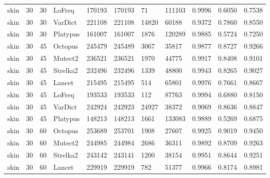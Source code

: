 \documentclass{article}
\begin{document}
\begin{table}[ht!]
{\begin{tabular}{lrrllllllll}
   skin &            30 &            30 &    LoFreq &            170193 &        170193 &        71 &    111103 &    0.9996 &      0.6050 &    0.7538 \\
   skin &            30 &            30 &   VarDict &            221108 &        221108 &     14820 &     60188 &    0.9372 &      0.7860 &    0.8550 \\
   skin &            30 &            30 &  Platypus &            161007 &        161007 &      1876 &    120289 &    0.9885 &      0.5724 &    0.7250 \\
   skin &            30 &            45 &   Octopus &            245479 &        245489 &      3067 &     35817 &    0.9877 &      0.8727 &    0.9266 \\
   skin &            30 &            45 &   Mutect2 &            236521 &        236521 &      1970 &     44775 &    0.9917 &      0.8408 &    0.9101 \\
   skin &            30 &            45 &  Strelka2 &            232496 &        232496 &      1339 &     48800 &    0.9943 &      0.8265 &    0.9027 \\
   skin &            30 &            45 &    Lancet &            215495 &        215495 &       514 &     65801 &    0.9976 &      0.7661 &    0.8667 \\
   skin &            30 &            45 &    LoFreq &            193533 &        193533 &       112 &     87763 &    0.9994 &      0.6880 &    0.8150 \\
   skin &            30 &            45 &   VarDict &            242924 &        242923 &     24927 &     38372 &    0.9069 &      0.8636 &    0.8847 \\
   skin &            30 &            45 &  Platypus &            148213 &        148213 &      1661 &    133083 &    0.9889 &      0.5269 &    0.6875 \\
   skin &            30 &            60 &   Octopus &            253689 &        253701 &      1908 &     27607 &    0.9925 &      0.9019 &    0.9450 \\
   skin &            30 &            60 &   Mutect2 &            244985 &        244984 &      2686 &     36311 &    0.9892 &      0.8709 &    0.9263 \\
   skin &            30 &            60 &  Strelka2 &            243142 &        243141 &      1200 &     38154 &    0.9951 &      0.8644 &    0.9251 \\
   skin &            30 &            60 &    Lancet &            229919 &        229919 &       782 &     51377 &    0.9966 &      0.8174 &    0.8981 \\

\end{tabular}}
\end{table}
\end{document}
